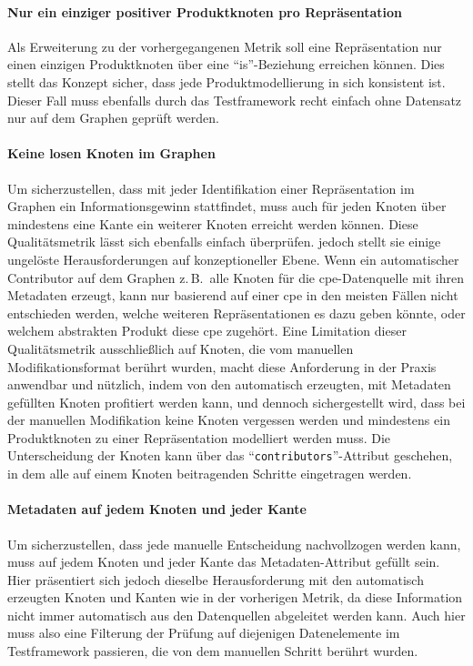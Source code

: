 \paragraph{Nur ein einziger positiver Produktknoten pro Repräsentation}
Als Erweiterung zu der vorhergegangenen Metrik soll eine Repräsentation nur einen einzigen Produktknoten über eine \enquote{is}-Beziehung erreichen können.
Dies stellt das Konzept sicher, dass jede Produktmodellierung in sich konsistent ist.
Dieser Fall muss ebenfalls durch das Testframework recht einfach ohne Datensatz nur auf dem Graphen geprüft werden.

\paragraph{Keine losen Knoten im Graphen}
Um sicherzustellen, dass mit jeder Identifikation einer Repräsentation im Graphen ein Informationsgewinn stattfindet, muss auch für jeden Knoten über mindestens eine Kante ein weiterer Knoten erreicht werden können.
Diese Qualitätsmetrik lässt sich ebenfalls einfach überprüfen.
jedoch stellt sie einige ungelöste Herausforderungen auf konzeptioneller Ebene.
Wenn ein automatischer Contributor auf dem Graphen z.\,B.\ alle Knoten für die \acrshort{cpe}-Datenquelle mit ihren Metadaten erzeugt, kann nur basierend auf einer \acrshort{cpe} in den meisten Fällen nicht entschieden werden, welche weiteren Repräsentationen es dazu geben könnte, oder welchem abstrakten Produkt diese \acrshort{cpe} zugehört.
Eine Limitation dieser Qualitätsmetrik ausschließlich auf Knoten, die vom manuellen Modifikationsformat berührt wurden, macht diese Anforderung in der Praxis anwendbar und nützlich, indem von den automatisch erzeugten, mit Metadaten gefüllten Knoten profitiert werden kann, und dennoch sichergestellt wird, dass bei der manuellen Modifikation keine Knoten vergessen werden und mindestens ein Produktknoten zu einer Repräsentation modelliert werden muss.
Die Unterscheidung der Knoten kann über das \enquote{\texttt{contributors}}-Attribut geschehen, in dem alle auf einem Knoten beitragenden Schritte eingetragen werden.

\paragraph{Metadaten auf jedem Knoten und jeder Kante}
Um sicherzustellen, dass jede manuelle Entscheidung nachvollzogen werden kann, muss auf jedem Knoten und jeder Kante das Metadaten-Attribut gefüllt sein.
Hier präsentiert sich jedoch dieselbe Herausforderung mit den automatisch erzeugten Knoten und Kanten wie in der vorherigen Metrik, da diese Information nicht immer automatisch aus den Datenquellen abgeleitet werden kann.
Auch hier muss also eine Filterung der Prüfung auf diejenigen Datenelemente im Testframework passieren, die von dem manuellen Schritt berührt wurden.

